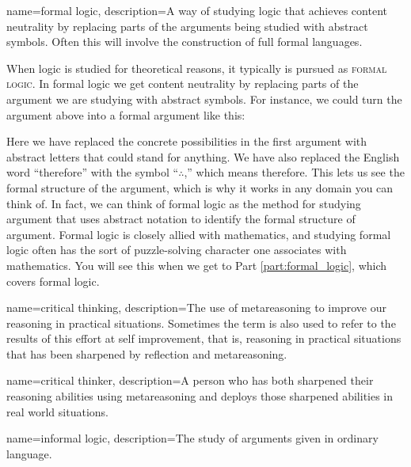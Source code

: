 {
name=formal logic,
description={A way of studying logic that achieves content neutrality by replacing parts of the arguments being studied with abstract symbols. Often this will involve the construction of full formal languages.}
}


When logic is studied for theoretical reasons, it typically is pursued as \textsc{\gls{formal logic}}. \label{def:formal_logic} In formal logic we get content neutrality by replacing parts of the argument we are studying with abstract symbols. For instance, we could turn the argument above into a formal argument like this:

\label{argClueformal}
\begin{kormanize}
\end{kormanize}

Here we have replaced the concrete possibilities in the first argument with abstract letters that could stand for anything. We have also replaced the English word ``therefore'' with the symbol ``$\therefore$,'' which means therefore. This lets us see the formal structure of the argument, which is why it works in any domain you can think of. In fact, we can think of formal logic as the method for studying argument that uses abstract notation to identify the formal structure of argument.  Formal logic is closely allied with mathematics, and studying formal logic often has the sort of puzzle-solving character one associates with mathematics. You will see this when we get to Part \ref{part:formal_logic}, which covers formal logic.

{
name=critical thinking,
description={The use of metareasoning to improve our reasoning in practical situations. Sometimes the term is also used to refer to the results of this effort at self improvement, that is, reasoning in practical situations that has been sharpened by reflection and metareasoning.}
}

{
name=critical thinker,
description={A person who has both sharpened their reasoning abilities using metareasoning and deploys those sharpened abilities in real world situations.}
}

{
name=informal logic,
description={The study of arguments given in ordinary language.}
}


